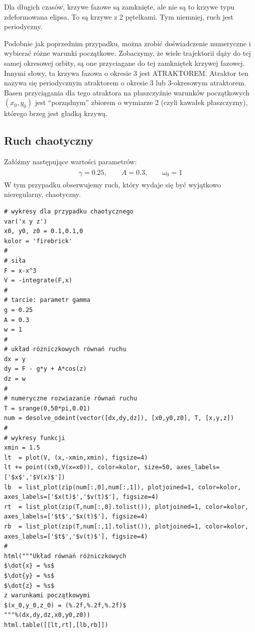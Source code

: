 \documentclass[a4paper,12pt,polish]{sphinxmanual}
\begin{document}
Dla długich czasów, krzywe fazowe są zamknięte, ale nie są  to krzywe typu zdeformowana elipsa.  To są krzywe z 2 pętelkami. Tym niemniej, ruch jest periodyczny.

Podobnie jak poprzednim przypadku, można zrobić doświadczenie numeryczne i wybierać różne warunki początkowe. Zobaczymy, że wiele trajektorii dąży do tej samej  okresowej orbity, są one  przyciagane do tej  zamkniętek krzywej fazowej. Innymi słowy, ta krzywa fazowa o okresie 3  jest ATRAKTOREM.  Atraktor ten nazywa się periodycznym atraktorem o okresie 3 lub 3-okresowym  atraktorem.  Basen przyciągania dla tego atraktora  na płaszczyźnie warunków początkowych $(x_0, y_0)$  jest ``porządnym'' zbiorem o wymiarze 2 (czyli kawałek płaszczyzny), którego brzeg jest gładką krzywą.


\subsection{Ruch chaotyczny}
\label{ch2/chII011:ruch-chaotyczny}
Załóżmy następujące wartości parametrów:
\label{ch2/chII011:equation-eqn21}\begin{gather}
\begin{split}\gamma = 0.25, \qquad A = 0.3, \qquad \omega_0 = 1\end{split}\label{ch2/chII011-eqn21}
\end{gather}
W tym przypadku obserwujemy ruch, który wydaje się być wyjątkowo nieregularny, chaotyczny.


\begin{verbatim}
# wykresy dla przypadku chaotycznego
var('x y z')
x0, y0, z0 = 0.1,0.1,0
kolor = 'firebrick'
#
# siła
F = x-x^3
V = -integrate(F,x)
#
# tarcie: parametr gamma
g = 0.25
A = 0.3
w = 1
#
# układ różniczkowych równań ruchu
dx = y
dy = F - g*y + A*cos(z)
dz = w
#
# numeryczne rozwiazanie równań ruchu
T = srange(0,50*pi,0.01)
num = desolve_odeint(vector([dx,dy,dz]), [x0,y0,z0], T, [x,y,z])
#
# wykresy funkcji
xmin = 1.5
lt  = plot(V, (x,-xmin,xmin), figsize=4)
lt += point((x0,V(x=x0)), color=kolor, size=50, axes_labels=['$x$','$V(x)$'])
lb  = list_plot(zip(num[:,0],num[:,1]), plotjoined=1, color=kolor, axes_labels=['$x(t)$','$v(t)$'], figsize=4)
rt  = list_plot(zip(T,num[:,0].tolist()), plotjoined=1, color=kolor, axes_labels=['$t$','$x(t)$'], figsize=4)
rb  = list_plot(zip(T,num[:,1].tolist()), plotjoined=1, color=kolor, axes_labels=['$t$','$v(t)$'], figsize=4)
#
html("""Układ równań różniczkowych
$\dot{x} = %s$
$\dot{y} = %s$
$\dot{z} = %s$
z warunkami początkowymi
$(x_0,y_0,z_0) = (%.2f,%.2f,%.2f)$
"""%(dx,dy,dz,x0,y0,z0))
html.table([[lt,rt],[lb,rb]])
\end{verbatim}
\end{document}
